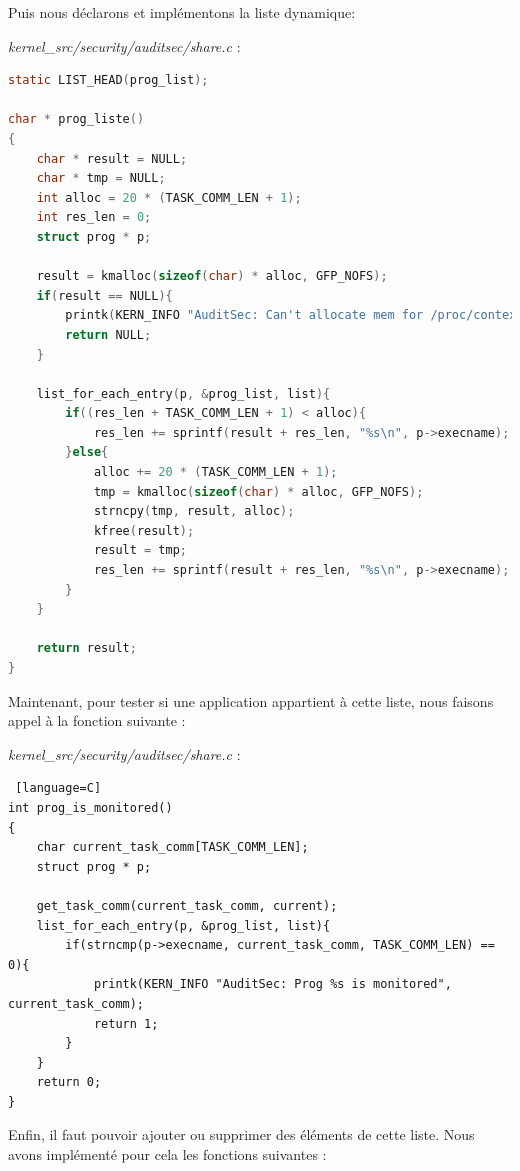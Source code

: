 \documentclass[pdftex,a4paper,titlepage,11pt]{article}
\begin{document}
Puis nous déclarons et implémentons la liste dynamique:

\textit{{kernel\_src}/security/auditsec/share.c} :
\begin{lstlisting}[language=C]
static LIST_HEAD(prog_list);

char * prog_liste()
{
	char * result = NULL;
	char * tmp = NULL;
	int alloc = 20 * (TASK_COMM_LEN + 1);
	int res_len = 0;
	struct prog * p;
	
	result = kmalloc(sizeof(char) * alloc, GFP_NOFS);
	if(result == NULL){
		printk(KERN_INFO "AuditSec: Can't allocate mem for /proc/contextd/programs");
		return NULL;
	}

	list_for_each_entry(p, &prog_list, list){
		if((res_len + TASK_COMM_LEN + 1) < alloc){
			res_len += sprintf(result + res_len, "%s\n", p->execname);
		}else{
			alloc += 20 * (TASK_COMM_LEN + 1);
			tmp = kmalloc(sizeof(char) * alloc, GFP_NOFS);
			strncpy(tmp, result, alloc);
			kfree(result);
			result = tmp;
			res_len += sprintf(result + res_len, "%s\n", p->execname);
		}
	}

	return result;
}
\end{lstlisting} 

Maintenant, pour tester si une application appartient à cette liste, nous faisons appel à la fonction suivante :

\textit{{kernel\_src}/security/auditsec/share.c} :
\begin{lstlisting} [language=C]
int prog_is_monitored()
{
	char current_task_comm[TASK_COMM_LEN];
	struct prog * p;

	get_task_comm(current_task_comm, current);
	list_for_each_entry(p, &prog_list, list){
		if(strncmp(p->execname, current_task_comm, TASK_COMM_LEN) == 0){
			printk(KERN_INFO "AuditSec: Prog %s is monitored", current_task_comm);
			return 1;
		}
	}
	return 0;
}
\end{lstlisting} 

Enfin, il faut pouvoir ajouter ou supprimer des éléments de cette liste. Nous avons implémenté pour cela les fonctions suivantes :
\end{document}

